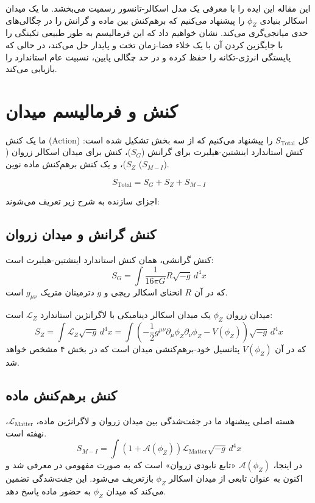 \documentclass[12pt, a4paper]{article}
\newcommand{\phiZ}{\phi_Z}
\newcommand{\Lmat}{\mathcal{L}_{\text{Matter}}}
\newcommand{\Aphi}{\mathcal{A}(\phiZ)}
\newcommand{\Vphi}{V(\phiZ)}
\begin{document}
این مقاله این ایده را با معرفی یک مدل اسکالر-تانسور رسمیت می‌بخشد. ما یک میدان اسکالر بنیادی $\phiZ$ را پیشنهاد می‌کنیم که برهم‌کنش بین ماده و گرانش را در چگالی‌های حدی میانجی‌گری می‌کند. نشان خواهیم داد که این فرمالیسم به طور طبیعی تکینگی را با جایگزین کردن آن با یک خلاء فضا-زمان تخت و پایدار حل می‌کند، در حالی که پایستگی انرژی-تکانه را حفظ کرده و در حد چگالی پایین، نسبیت عام استاندارد را بازیابی می‌کند.

\section{کنش و فرمالیسم میدان}

ما یک کنش (Action) کل $S_{\text{Total}}$ را پیشنهاد می‌کنیم که از سه بخش تشکیل شده است: کنش استاندارد اینشتین-هیلبرت برای گرانش ($S_G$)، کنش برای میدان اسکالر زروان ($S_Z$)، و یک کنش برهم‌کنش ماده نوین ($S_{M-I}$).

\begin{equation}
S_{\text{Total}} = S_G + S_Z + S_{M-I}
\end{equation}

اجزای سازنده به شرح زیر تعریف می‌شوند:

\subsection{کنش گرانش و میدان زروان}
کنش گرانشی، همان کنش استاندارد اینشتین-هیلبرت است:
\begin{equation}
S_G = \int \frac{1}{16\pi G} R \sqrt{-g} \, d^4x
\end{equation}
که در آن $R$ انحنای اسکالر ریچی و $g$ دترمینان متریک $g_{\mu\nu}$ است.

میدان زروان $\phiZ$ یک میدان اسکالر دینامیکی با لاگرانژین استاندارد $\mathcal{L}_Z$ است:
\begin{equation}
S_Z = \int \mathcal{L}_Z \sqrt{-g} \, d^4x = \int \left( -\frac{1}{2} g^{\mu\nu} \partial_\mu \phiZ \partial_\nu \phiZ - \Vphi \right) \sqrt{-g} \, d^4x
\end{equation}
که در آن $\Vphi$ پتانسیل خود-برهم‌کنشی میدان است که در بخش ۴ مشخص خواهد شد.

\subsection{کنش برهم‌کنش ماده}
هسته اصلی پیشنهاد ما در جفت‌شدگی بین میدان زروان و لاگرانژین ماده، $\Lmat$، نهفته است.
\begin{equation}
S_{M-I} = \int \left( 1 + \Aphi \right) \Lmat \sqrt{-g} \, d^4x
\end{equation}
در اینجا، $\Aphi$ «تابع نابودی زروان» است که به صورت مفهومی در \cite{ahani_dynamic_model} معرفی شد و اکنون به عنوان تابعی از میدان اسکالر $\phiZ$ بازتعریف می‌شود. این جفت‌شدگی تضمین می‌کند که میدان $\phiZ$ به حضور ماده پاسخ دهد.
\end{document}
